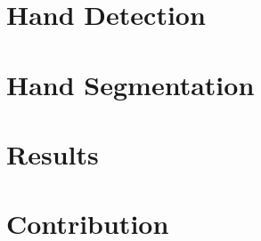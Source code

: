 \documentclass[12pt]{report}
\begin{document}

\tableofcontents\newpage

\chapter{Hand Detection}


\chapter{Hand Segmentation}


\chapter{Results}


\chapter{Contribution}

\end{document}
